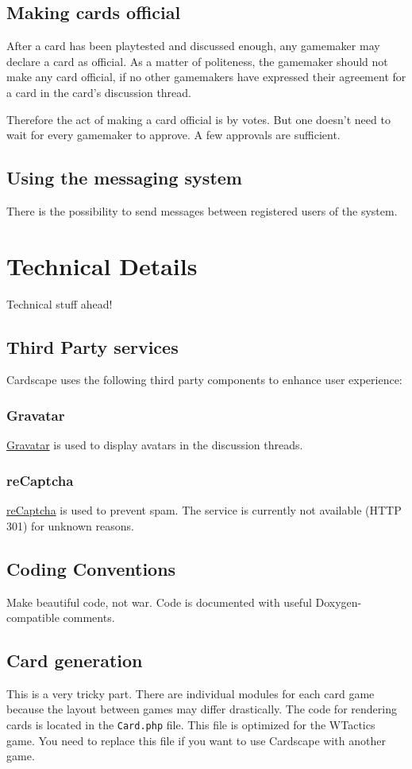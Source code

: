 \documentclass[a4paper, 11pt]{scrbook}
\begin{document}
\section{Making cards official}
After a card has been playtested and discussed enough, any gamemaker may declare a card as official. As a matter of politeness, the gamemaker should not make any card official, if no other gamemakers have expressed their agreement for a card in the card's discussion thread.

Therefore the act of making a card official is by votes. But one doesn't need to wait for every gamemaker to approve. A few approvals are sufficient.

\section{Using the messaging system}
There is the possibility to send messages between registered users of the system. 

\chapter{Technical Details}
Technical stuff ahead!

\section{Third Party services}

Cardscape uses the following third party components to enhance user experience:
\subsection{Gravatar}
\href{http://www.gravatar.com/}{Gravatar} is used to display avatars in the discussion threads.

\subsection[reCaptcha]{reCaptcha}
\href{http://www.recaptcha.net}{reCaptcha} is used to prevent spam. The service is currently not available (HTTP 301) for unknown reasons.

\section{Coding Conventions}
Make beautiful code, not war. Code is documented with useful Doxygen-compatible comments.

\section{Card generation}
This is a very tricky part. There are individual modules for each card game because the layout between games may differ drastically. The code for rendering cards is located in the \texttt{Card.php} file. This file is optimized for the WTactics game. You need to replace this file if you want to use Cardscape with another game.
\end{document}
